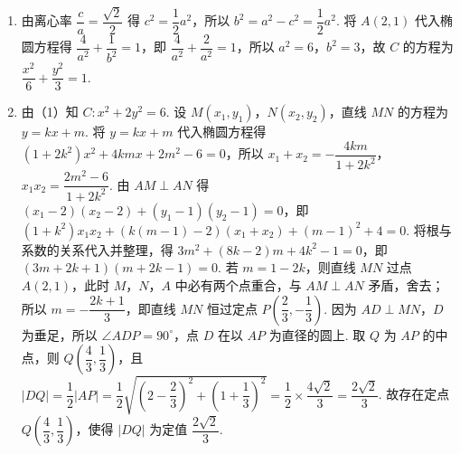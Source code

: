 \begin{solution}
\begin{enumerate}
\item 由离心率 \(\dfrac ca=\dfrac{\sqrt2}{2}\) 得 \(c^2=\dfrac12a^2\)，所以 \(b^2=a^2-c^2=\dfrac12a^2\). 将 \(A(2,1)\) 代入椭圆方程得 \(\dfrac4{a^2}+\dfrac1{b^2}=1\)，即 \(\dfrac4{a^2}+\dfrac2{a^2}=1\)，所以 \(a^2=6\)，\(b^2=3\)，故 \(C\) 的方程为 \(\dfrac{x^2}{6}+\dfrac{y^2}{3}=1\).
\item 由（1）知 \(C:x^2+2y^2=6\). 设 \(M(x_1,y_1)\)，\(N(x_2,y_2)\)，直线 \(MN\) 的方程为 \(y=kx+m\). 将 \(y=kx+m\) 代入椭圆方程得 \((1+2k^2)x^2+4kmx+2m^2-6=0\)，所以 \(x_1+x_2=-\dfrac{4km}{1+2k^2}\)，\(x_1x_2=\dfrac{2m^2-6}{1+2k^2}\). 由 \(AM\perp AN\) 得 \((x_1-2)(x_2-2)+(y_1-1)(y_2-1)=0\)，即 \((1+k^2)x_1x_2+(k(m-1)-2)(x_1+x_2)+(m-1)^2+4=0\). 将根与系数的关系代入并整理，得 \(3m^2+(8k-2)m+4k^2-1=0\)，即 \((3m+2k+1)(m+2k-1)=0\). 若 \(m=1-2k\)，则直线 \(MN\) 过点 \(A(2,1)\)，此时 \(M\)，\(N\)，\(A\) 中必有两个点重合，与 \(AM\perp AN\) 矛盾，舍去；所以 \(m=-\dfrac{2k+1}{3}\)，即直线 \(MN\) 恒过定点 \(P\left(\dfrac23,-\dfrac13\right)\). 因为 \(AD\perp MN\)，\(D\) 为垂足，所以 \(\angle ADP=90^\circ\)，点 \(D\) 在以 \(AP\) 为直径的圆上. 取 \(Q\) 为 \(AP\) 的中点，则 \(Q\left(\dfrac43,\dfrac13\right)\)，且 \(|DQ|=\dfrac12|AP|=\dfrac12\sqrt{\left(2-\dfrac23\right)^2+\left(1+\dfrac13\right)^2}=\dfrac12\times\dfrac{4\sqrt2}{3}=\dfrac{2\sqrt2}{3}\). 故存在定点 \(Q\left(\dfrac43,\dfrac13\right)\)，使得 \(|DQ|\) 为定值 \(\dfrac{2\sqrt2}{3}\).
\end{enumerate}
\end{solution}
